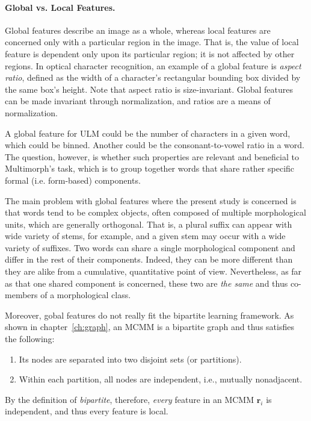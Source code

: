 \paragraph{Global vs. Local Features.}
Global features describe an image as a whole, whereas local features are concerned
only with a particular region in the image. That is, the value of local feature is dependent
only upon its particular region; it is not affected by other regions. 
In optical character recognition, an example of a global feature is \emph{aspect ratio}, defined 
as the width of a character's rectangular bounding box divided by the same 
box's height. Note that aspect ratio is size-invariant. Global features 
can be made invariant 
through normalization, and ratios are a means of normalization.

A global feature for ULM could be the number 
of characters in a given word, which could be binned. Another 
could be the consonant-to-vowel ratio in a word. The question, however, is 
whether such properties are relevant and beneficial to Multimorph's task,
which is to group together words that share rather specific formal (i.e. form-based) components. 

The main problem with global features where the present study is concerned is that
words tend to be complex objects, often composed of 
multiple morphological units, which are 
generally orthogonal. That is, a plural suffix can 
appear with wide variety of stems, for example, and a 
given stem may occur with a wide variety of suffixes.
Two words can share a single morphological component and 
differ in the rest of their components. Indeed,
they can be more different than they are alike from a cumulative, 
quantitative point of view. Nevertheless,
as far as that one shared component is concerned, these two are 
\emph{the same} and thus co-members of a morphological
class. 

Moreover, gobal features do not really fit the bipartite learning framework.
As shown in chapter~\ref{ch:graph}, an MCMM is a bipartite graph and thus 
satisfies the following:
\begin{enumerate}
\item Its nodes are separated into two disjoint sets (or partitions).
\item Within each partition, all nodes are independent, i.e., mutually 
nonadjacent.
\end{enumerate}
By the definition of \emph{bipartite}, therefore, \emph{every} feature in an MCMM $\textbf{r}_i$ is independent,
and thus every feature is local. 

